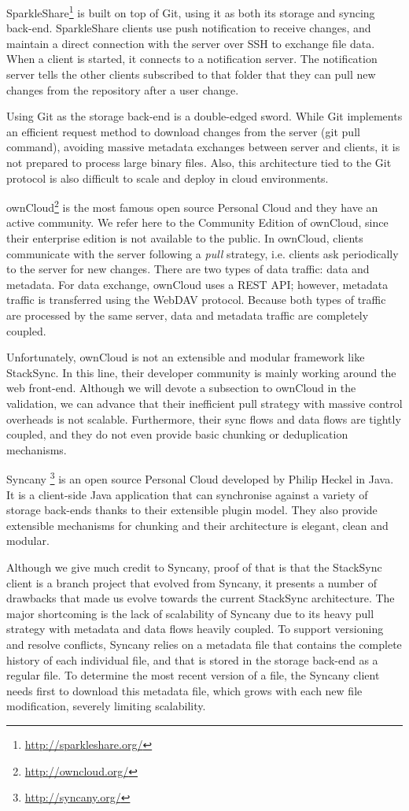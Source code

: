 SparkleShare\footnote{\url{http://sparkleshare.org/}} is built on top of Git, using it 
as both its storage and syncing back-end. SparkleShare clients use push notification
to receive changes, and maintain a direct connection with the server over SSH to exchange file data.
When a client is started, it connects to a notification server. The notification server tells the other
clients subscribed to that folder that they can pull new changes from the repository after a user
change. 

Using Git as the storage back-end is a double-edged sword. While Git implements an efficient request
method to download changes from the server (git pull command), avoiding massive metadata exchanges
between server and clients, it is not prepared to process large binary files. Also, this architecture
tied to the Git protocol is also difficult to scale and deploy in cloud environments.

ownCloud\footnote{\url{http://owncloud.org/}} is the most famous open source  Personal Cloud 
and they have an active community. We refer here to the Community Edition of ownCloud, since their enterprise edition is not available to the public. In ownCloud, clients communicate with the server following a \textit{pull} strategy, i.e. clients ask periodically to the server for new changes. There are two types of data traffic: data and metadata. For data exchange, ownCloud uses a REST API; however, metadata traffic is transferred using the WebDAV protocol. 
Because both types of traffic are processed by the same server, data and metadata traffic are completely coupled.

Unfortunately, ownCloud is not an extensible and modular framework like StackSync. In this line, their developer community is mainly working around the web front-end. Although we will devote a subsection to ownCloud in the validation, we can advance that their inefficient pull strategy with massive control overheads is not scalable. Furthermore, their sync flows and data flows are tightly coupled, and they do not even provide basic chunking or deduplication mechanisms. 

Syncany \footnote{\url{http://syncany.org/}} is an open source Personal Cloud developed by Philip Heckel in Java. It is a client-side Java application that can synchronise against a variety of storage back-ends thanks to their extensible plugin model. They also provide extensible mechanisms for chunking and their architecture is elegant, clean and modular.

Although we give much credit to Syncany, proof of that is that the StackSync client is a branch project that evolved 
from Syncany, it presents a number of drawbacks that made us evolve towards the current StackSync architecture. 
The major shortcoming is the lack of scalability of Syncany due to its heavy pull strategy with metadata and
data flows heavily coupled. To support versioning and resolve conflicts, Syncany relies on a metadata file 
that contains the complete history of each individual file, and that is stored in the storage back-end
as a regular file. To determine the most recent version of a file, the Syncany client needs first to
download this metadata file, which grows with each new file modification, severely limiting scalability.

